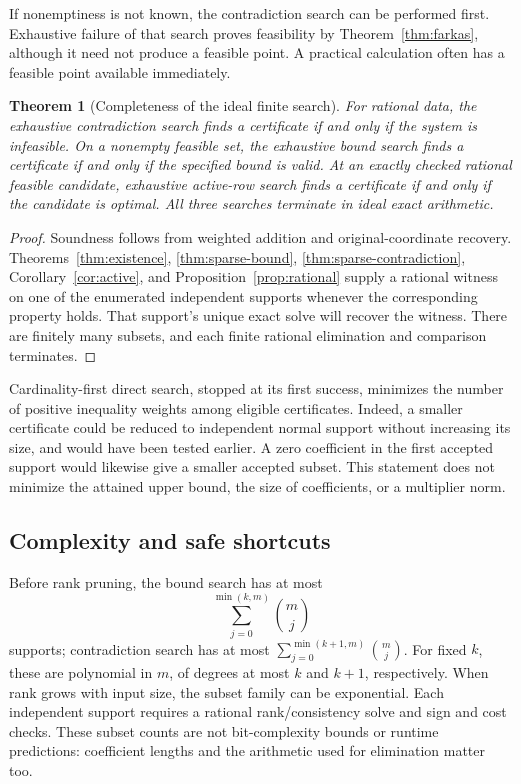 \documentclass[11pt,letterpaper]{article}
\newtheorem{theorem}{Theorem}[section]
\theoremstyle{definition}
\theoremstyle{remark}
\numberwithin{equation}{section}
\begin{document}
If nonemptiness is not known, the contradiction search can be performed first.
Exhaustive failure of that search proves feasibility by
Theorem~\ref{thm:farkas}, although it need not produce a feasible point.
A practical calculation often has a feasible point available immediately.

\begin{theorem}[Completeness of the ideal finite search]\label{thm:complete}
For rational data, the exhaustive contradiction search finds a certificate
if and only if the system is infeasible. On a nonempty feasible set, the
exhaustive bound search finds a certificate if and only if the specified bound
is valid. At an exactly checked rational feasible candidate,
exhaustive active-row search finds a certificate if and only if the candidate
is optimal. All three searches terminate in ideal exact arithmetic.
\end{theorem}
\begin{proof}
Soundness follows from weighted addition and original-coordinate recovery.
Theorems~\ref{thm:existence}, \ref{thm:sparse-bound},
\ref{thm:sparse-contradiction}, Corollary~\ref{cor:active}, and
Proposition~\ref{prop:rational} supply a rational witness on one of the
enumerated independent supports whenever the corresponding property holds.
That support's unique exact solve will recover the witness.
There are finitely many subsets, and each finite rational elimination and
comparison terminates.
\end{proof}

Cardinality-first direct search, stopped at its first success, minimizes the
number of positive inequality weights among eligible certificates.
Indeed, a smaller certificate could be reduced to independent normal support
without increasing its size, and would have been tested earlier.
A zero coefficient in the first accepted support would likewise give a
smaller accepted subset. This statement does not minimize the attained
upper bound, the size of coefficients, or a multiplier norm.

\subsection{Complexity and safe shortcuts}

Before rank pruning, the bound search has at most
\begin{equation}\label{eq:count}
 \sum_{j=0}^{\min(k,m)}\binom mj
\end{equation}
supports; contradiction search has at most
\(\sum_{j=0}^{\min(k+1,m)}\binom mj\).
For fixed \(k\), these are polynomial in \(m\), of degrees at most \(k\)
and \(k+1\), respectively. When rank grows with input size, the subset
family can be exponential. Each independent support requires a rational
rank/consistency solve and sign and cost checks. These subset counts are
not bit-complexity bounds or runtime predictions: coefficient lengths and
the arithmetic used for elimination matter too.
\end{document}
